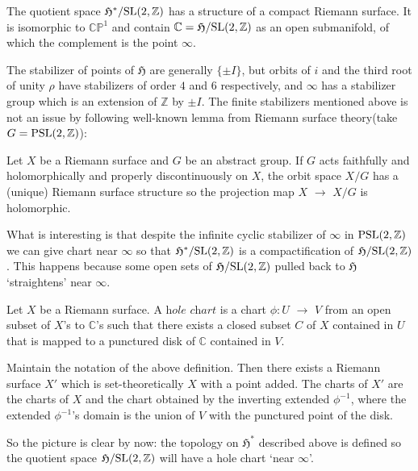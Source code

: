 \documentclass[a4paper,11pt]{article}
\begin{document}
\begin{thm}
The quotient space $\mathfrak{H}^*/\textnormal{SL}(2,\mathbb{Z})$ has a structure of a compact Riemann surface.
It is isomorphic to $\mathbb{CP}^1$ and contain $\mathbb{C}=\mathfrak{H}/\textnormal{SL}(2,\mathbb{Z})$ as an open submanifold, of which the complement is the point $\infty$.
\end{thm}

The stabilizer of points of $\mathfrak{H}$ are generally $\{\pm$$I\}$, but orbits of $i$ and the third root of unity $\rho$ have stabilizers of order $4$ and $6$ respectively, and $\infty$ has a stabilizer group which is an extension of $\mathbb{Z}$ by $\pm$$I$.
The finite stabilizers mentioned above is not an issue by following well-known lemma from Riemann surface theory(take $G=\textnormal{PSL}(2,\mathbb{Z})$):
\begin{lem}
Let $X$ be a Riemann surface and $G$ be an abstract group.
If $G$ acts faithfully and holomorphically and properly discontinuously on $X$, the orbit space $X/G$ has a (unique) Riemann surface structure so the projection map $X$ $\to$ $X/G$ is holomorphic.
\end{lem}

What is interesting is that despite the infinite cyclic stabilizer of $\infty$ in $\textnormal{PSL}(2,\mathbb{Z})$ we can give chart near $\infty$ so that $\mathfrak{H}^*/\textnormal{SL}(2,\mathbb{Z})$ is a compactification of $\mathfrak{H}/\textnormal{SL}(2,\mathbb{Z})$.
This happens because some open sets of $\mathfrak{H}/\textnormal{SL}(2,\mathbb{Z})$ pulled back to $\mathfrak{H}$ `straightens' near $\infty$.

\begin{defn}
Let $X$ be a Riemann surface.
A $\textit{hole chart}$ is a chart $\phi:U$ $\to$ $V$ from an open subset of $X$'s to $\mathbb{C}$'s such that there exists a closed subset $C$ of $X$ contained in $U$ that is mapped to a punctured disk of $\mathbb{C}$ contained in $V$.
\end{defn}

\begin{lem}
Maintain the notation of the above definition.
Then there exists a Riemann surface $X'$ which is set-theoretically $X$ with a point added.
The charts of $X'$ are the charts of $X$ and the chart obtained by the inverting extended $\phi^{-1}$, where the extended $\phi^{-1}$'s domain is the union of $V$ with the punctured point of the disk.
\end{lem}

So the picture is clear by now: the topology on $\mathfrak{H}^*$ described above is defined so the quotient space $\mathfrak{H}/\textnormal{SL}(2,\mathbb{Z})$ will have a hole chart `near $\infty$'.\\
\end{document}
